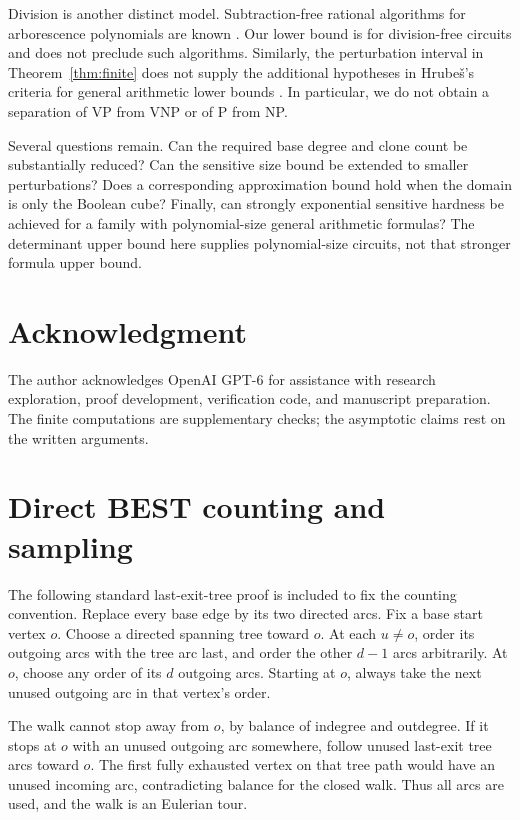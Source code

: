 \documentclass[11pt]{article}
\theoremstyle{definition}
\theoremstyle{remark}
\numberwithin{equation}{section}
\begin{document}
Division is another distinct model. Subtraction-free rational algorithms
for arborescence polynomials are known \cite{FGK2013}. Our lower bound
is for division-free circuits and does not preclude such algorithms.
Similarly, the perturbation interval in Theorem~\ref{thm:finite} does
not supply the additional hypotheses in Hrube\v{s}'s criteria for
general arithmetic lower bounds \cite{Hrubes2020}. In particular,
we do not obtain a separation of VP from VNP or of P from NP.

Several questions remain. Can the required base degree and clone count
be substantially reduced? Can the sensitive size bound be extended to
smaller perturbations? Does a corresponding approximation bound hold
when the domain is only the Boolean cube? Finally, can strongly
exponential sensitive hardness be achieved for a family with
polynomial-size general arithmetic formulas? The determinant upper
bound here supplies polynomial-size circuits, not that stronger
formula upper bound.

\section*{Acknowledgment}
The author acknowledges OpenAI GPT-6 for assistance with research
exploration, proof development, verification code, and manuscript
preparation. The finite computations are supplementary checks;
the asymptotic claims rest on the written arguments.



\appendix


\section{Direct BEST counting and sampling}\label{app:best}
The following standard last-exit-tree proof \cite{FarrellLevine2015} is included to
fix the counting convention. Replace every base edge by its two
directed arcs. Fix a base start vertex \(o\).
Choose a directed spanning tree toward \(o\). At each \(u\ne o\),
order its outgoing arcs with the tree arc last, and order the
other \(d-1\) arcs arbitrarily. At \(o\), choose any order of its
\(d\) outgoing arcs. Starting at \(o\), always take the next unused
outgoing arc in that vertex's order.

The walk cannot stop away from \(o\), by balance of indegree and
outdegree. If it stops at \(o\) with an unused outgoing arc
somewhere, follow unused last-exit tree arcs toward \(o\).
The first fully exhausted vertex on that tree path would have an
unused incoming arc, contradicting balance for the closed walk.
Thus all arcs are used, and the walk is an Eulerian tour.
\end{document}
